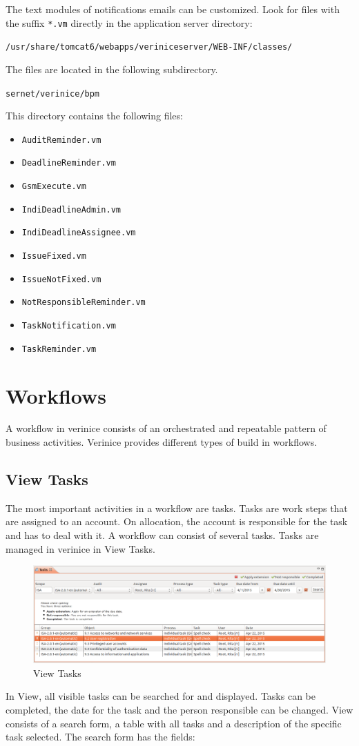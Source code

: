 \documentclass[a4paper,10pt]{book}
\begin{document}
The text modules of notifications emails can be customized. Look for
files with the suffix \texttt{*.vm} directly in the application server
directory:

\texttt{/usr/share/tomcat6/webapps/veriniceserver/WEB-INF/classes/}

The files are located in the following subdirectory.

\texttt{sernet/verinice/bpm}

This directory contains the following files:

\begin{itemize}
  \item \texttt{AuditReminder.vm}
  \item \texttt{DeadlineReminder.vm}
  \item \texttt{GsmExecute.vm}
  \item \texttt{IndiDeadlineAdmin.vm}
  \item \texttt{IndiDeadlineAssignee.vm}
  \item \texttt{IssueFixed.vm}
  \item \texttt{IssueNotFixed.vm}
  \item \texttt{NotResponsibleReminder.vm}
  \item \texttt{TaskNotification.vm}
  \item \texttt{TaskReminder.vm}
\end{itemize}

\section{Workflows}
A workflow in verinice consists of an orchestrated and repeatable pattern of business activities. Verinice provides different types of build in workflows.

\subsection{View Tasks}

The most important activities in a workflow are tasks. Tasks are work steps that are assigned to an account. On allocation, the account is responsible for the task and has to deal with it. A workflow can consist of several tasks. Tasks are managed in verinice in View Tasks.
\begin{figure}[htb!]
  \centering
  \includegraphics[scale=.26]{Screenshot/Task_view_screenshot-en.png}
  \caption{\label{fig:view-tasks} View Tasks}
\end{figure}
In View, all visible tasks can be searched for and displayed. Tasks can be completed, the date for the task and the person responsible can be changed. View consists of a search form, a table with all tasks and a description of the specific task selected. The search form has the fields:
\end{document}
